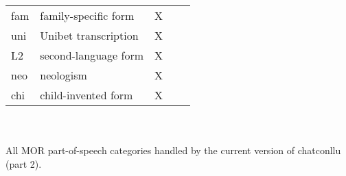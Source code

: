 \begin{table}[h!]
\begin{tabular}{@{}lllll@{}}
fam & family-specific form & X\\
uni & Unibet transcription & X\\
L2 & second-language form & X\\
neo & neologism & X\\
chi & child-invented form & X\\\bottomrule
\end{tabular}\\
\vspace{0.5cm}
\\
All MOR part-of-speech categories handled by the current version of chatconllu (part 2).\\
\end{table}

